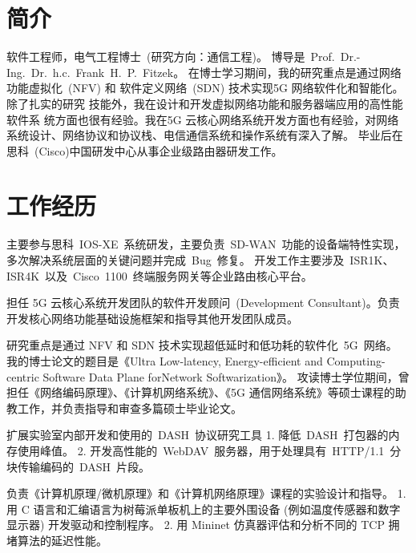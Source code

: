 \documentclass[11pt,a4paper]{moderncv}
\begin{document}
\maketitle
\vspace*{-14mm}

\section{简介}

软件工程师，电气工程博士~(研究方向：通信工程)。
博导是~Prof.~Dr.-Ing.~Dr.~h.c.~Frank~H.~P.~Fitzek。
在博士学习期间，我的研究重点是通过网络功能虚拟化~(NFV) 和
软件定义网络~(SDN) 技术实现5G 网络软件化和智能化。除了扎实的研究
技能外，我在设计和开发虚拟网络功能和服务器端应用的高性能软件系
统方面也很有经验。我在5G 云核心网络系统开发方面也有经验，对网络
系统设计、网络协议和协议栈、电信通信系统和操作系统有深入了解。
毕业后在思科~(Cisco)中国研发中心从事企业级路由器研发工作。

\section{工作经历}

{主要参与思科~IOS-XE~系统研发，主要负责~SD-WAN~功能的设备端特性实现，多次解决系统层面的关键问题并完成~Bug~修复。
	开发工作主要涉及~ISR1K、ISR4K~以及~Cisco~1100~终端服务网关等企业路由核心平台。}

{担任 5G 云核心系统开发团队的软件开发顾问~(Development Consultant)。负责开发核心网络功能基础设施框架和指导其他开发团队成员。}

{研究重点是通过 NFV 和 SDN 技术实现超低延时和低功耗的软件化~5G~网络。
我的博士论文的题目是《Ultra Low-latency, Energy-efficient and Computing-centric Software Data Plane forNetwork Softwarization》。
攻读博士学位期间，曾担任《网络编码原理》、《计算机网络系统》、《5G 通信网络系统》等硕士课程的助教工作，并负责指导和审查多篇硕士毕业论文。}

{扩展实验室内部开发和使用的~DASH~协议研究工具
1. 降低~DASH~打包器的内存使用峰值。
2. 开发高性能的~WebDAV~服务器，用于处理具有~HTTP/1.1~分块传输编码的~DASH~片段。}

{负责《计算机原理/微机原理》和《计算机网络原理》课程的实验设计和指导。
1. 用 C 语言和汇编语言为树莓派单板机上的主要外围设备 (例如温度传感器和数字显示器) 开发驱动和控制程序。
2. 用 Mininet 仿真器评估和分析不同的 TCP 拥堵算法的延迟性能。}
\end{document}
